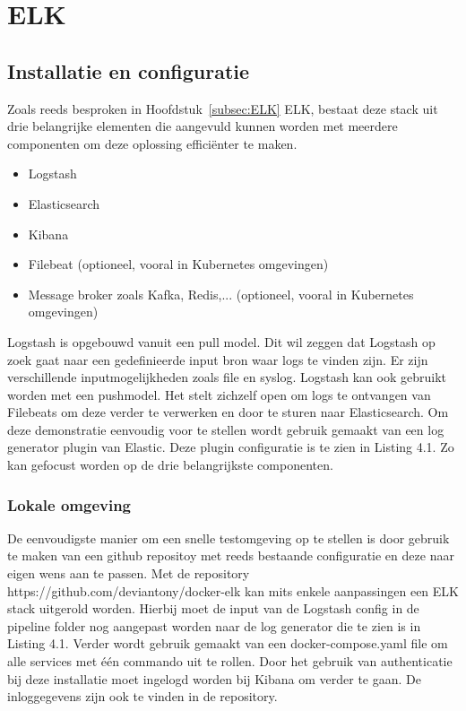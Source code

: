 
\chapter{ELK}
\label{ch:ELK}

\section{Installatie en configuratie}
Zoals reeds besproken in Hoofdstuk~\ref{subsec:ELK} ELK, bestaat deze stack uit drie belangrijke elementen die aangevuld kunnen worden met meerdere componenten om deze oplossing efficiënter te maken.
\begin{itemize}
    \item Logstash
    \item Elasticsearch
    \item Kibana
    \item Filebeat (optioneel, vooral in Kubernetes omgevingen)
    \item Message broker zoals Kafka, Redis,... (optioneel, vooral in Kubernetes omgevingen)
\end{itemize}

Logstash is opgebouwd vanuit een pull model. Dit wil zeggen dat Logstash op zoek gaat naar een gedefinieerde input bron waar logs te vinden zijn. Er zijn verschillende inputmogelijkheden zoals file en syslog. Logstash kan ook gebruikt worden met een pushmodel. Het stelt zichzelf open om logs te ontvangen van Filebeats om deze verder te verwerken en door te sturen naar Elasticsearch. Om deze demonstratie eenvoudig voor te stellen wordt gebruik gemaakt van een log generator plugin van Elastic. Deze plugin configuratie is te zien in Listing 4.1. Zo kan gefocust worden op de drie belangrijkste componenten.

\subsection{Lokale omgeving}

De eenvoudigste manier om een snelle testomgeving op te stellen is door gebruik te maken van een github repositoy met reeds bestaande configuratie en deze naar eigen wens aan te passen. Met de repository https://github.com/deviantony/docker-elk kan mits enkele aanpassingen een ELK stack uitgerold worden. Hierbij moet de input van de Logstash config in de pipeline folder nog aangepast worden naar de log generator die te zien is in Listing 4.1. Verder wordt gebruik gemaakt van een docker-compose.yaml file om alle services met één commando uit te rollen. Door het gebruik van authenticatie bij deze installatie moet ingelogd worden bij Kibana om verder te gaan. De inloggegevens zijn ook te vinden in de repository. 

